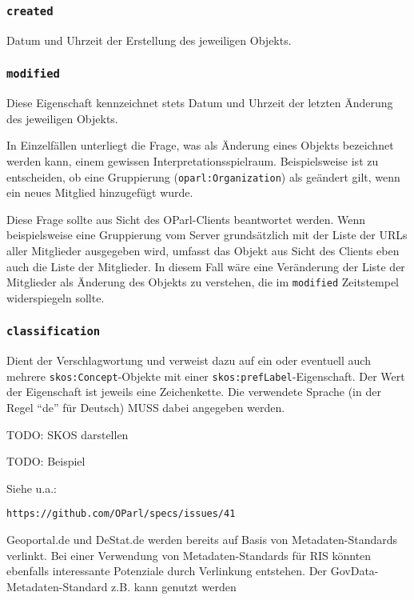 \documentclass[,a4paper]{article}
\begin{document}
\subsubsection{\texttt{created}}\label{created}

Datum und Uhrzeit der Erstellung des jeweiligen Objekts.

\subsubsection{\texttt{modified}}\label{modified}

Diese Eigenschaft kennzeichnet stets Datum und Uhrzeit der letzten
Änderung des jeweiligen Objekts.

In Einzelfällen unterliegt die Frage, was als Änderung eines Objekts
bezeichnet werden kann, einem gewissen Interpretationsspielraum.
Beispielsweise ist zu entscheiden, ob eine Gruppierung
(\texttt{oparl:Organization}) als geändert gilt, wenn ein neues Mitglied
hinzugefügt wurde.

Diese Frage sollte aus Sicht des OParl-Clients beantwortet werden. Wenn
beispielsweise eine Gruppierung vom Server grundsätzlich mit der Liste
der URLs aller Mitglieder ausgegeben wird, umfasst das Objekt aus Sicht
des Clients eben auch die Liste der Mitglieder. In diesem Fall wäre eine
Veränderung der Liste der Mitglieder als Änderung des Objekts zu
verstehen, die im \texttt{modified} Zeitstempel widerspiegeln sollte.

\subsubsection{\texttt{classification}}\label{classification}

Dient der Verschlagwortung und verweist dazu auf ein oder eventuell auch
mehrere \texttt{skos:Concept}-Objekte mit einer
\texttt{skos:prefLabel}-Eigenschaft. Der Wert der Eigenschaft ist
jeweils eine Zeichenkette. Die verwendete Sprache (in der Regel ``de''
für Deutsch) MUSS dabei angegeben werden.

TODO: SKOS darstellen

TODO: Beispiel

Siehe u.a.:

\begin{verbatim}
https://github.com/OParl/specs/issues/41
\end{verbatim}

Geoportal.de und DeStat.de werden bereits auf Basis von
Metadaten-Standards verlinkt. Bei einer Verwendung von
Metadaten-Standards für RIS könnten ebenfalls interessante Potenziale
durch Verlinkung entstehen. Der GovData-Metadaten-Standard z.B. kann
genutzt werden
\end{document}
